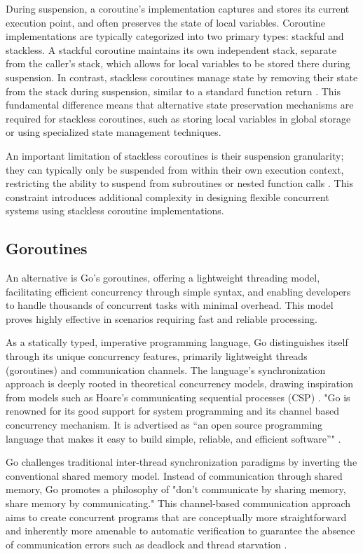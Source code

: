 \documentclass[]{interim}
\begin{document}
During suspension, a coroutine's implementation captures and stores
its current execution point, and often preserves the state of local variables.
Coroutine implementations are typically categorized into two primary types:
stackful and stackless. A stackful coroutine maintains its own independent
stack, separate from the caller's stack, which allows for local variables
to be stored there during suspension. In contrast, stackless coroutines
manage state by removing their state from the stack
during suspension, similar to a standard function return \cite{belson_survey_2019}.
This fundamental difference means that alternative state preservation
mechanisms are required for stackless coroutines, such as storing
local variables in global storage or using specialized state management techniques.

An important limitation of stackless coroutines is their suspension granularity;
they can typically only be suspended from within their own execution context,
restricting the ability to suspend from subroutines or nested function calls
\cite{belson_survey_2019}. This constraint introduces additional complexity
in designing flexible concurrent systems using stackless coroutine implementations.

\subsection{Goroutines}

An alternative is Go’s goroutines, offering a lightweight threading model,
facilitating efficient concurrency through
simple syntax, and enabling developers to handle thousands of concurrent tasks with
minimal overhead. This model proves highly effective in scenarios requiring fast
and reliable processing.

As a statically typed, imperative programming language, Go distinguishes
itself through its unique concurrency features, primarily lightweight threads
(goroutines) and communication channels.
The language's synchronization approach
is deeply rooted in theoretical concurrency models,
drawing inspiration from models such as Hoare's communicating sequential
processes (CSP) \cite{lange_empirical_2019}.
"Go is renowned for its good support for system programming
and its channel based concurrency mechanism. It is advertised
as “an open source programming
language that makes it easy to build simple, reliable, and
efficient software”" \cite{lange_empirical_2019}.

Go challenges traditional inter-thread synchronization
paradigms by inverting the conventional shared memory model. Instead
of communication through shared memory, Go promotes a philosophy of
"don't communicate by sharing memory, share memory by communicating."
This channel-based communication approach aims to create concurrent programs
that are conceptually more straightforward and inherently more amenable
to automatic verification to guarantee
the absence of communication errors such as deadlock and
thread starvation \cite{lange_empirical_2019}.
\end{document}
